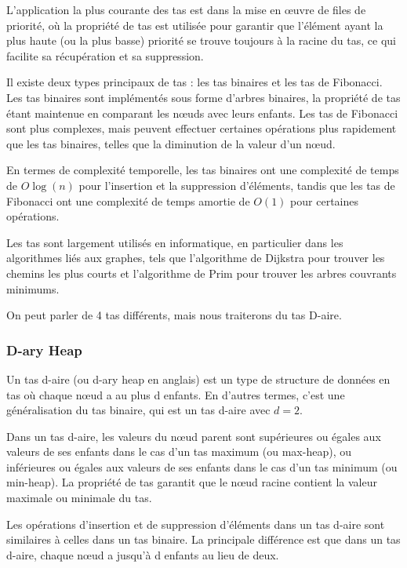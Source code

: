 \documentclass{article}
\begin{document}
            L'application la plus courante des tas est dans la mise en œuvre de files de priorité, où la propriété de tas est utilisée pour garantir que l'élément ayant la plus haute (ou la plus basse) priorité se trouve toujours à la racine du tas, ce qui facilite sa récupération et sa suppression.

            Il existe deux types principaux de tas : les tas binaires et les tas de Fibonacci. Les tas binaires sont implémentés sous forme d'arbres binaires, la propriété de tas étant maintenue en comparant les nœuds avec leurs enfants. Les tas de Fibonacci sont plus complexes, mais peuvent effectuer certaines opérations plus rapidement que les tas binaires, telles que la diminution de la valeur d'un nœud.

            En termes de complexité temporelle, les tas binaires ont une complexité de temps de $O\log(n)$ pour l'insertion et la suppression d'éléments, tandis que les tas de Fibonacci ont une complexité de temps amortie de $O(1)$  pour certaines opérations.

            Les tas sont largement utilisés en informatique, en particulier dans les algorithmes liés aux graphes, tels que l'algorithme de Dijkstra pour trouver les chemins les plus courts et l'algorithme de Prim pour trouver les arbres couvrants minimums.

            On peut parler de 4 tas différents, mais nous traiterons du tas D-aire.

            \subsubsection{D-ary Heap}
                Un tas d-aire (ou d-ary heap en anglais) est un type de structure de données en tas où chaque nœud a au plus d enfants. En d'autres termes, c'est une généralisation du tas binaire, qui est un tas d-aire avec $d=2$.

                Dans un tas d-aire, les valeurs du nœud parent sont supérieures ou égales aux valeurs de ses enfants dans le cas d'un tas maximum (ou max-heap), ou inférieures ou égales aux valeurs de ses enfants dans le cas d'un tas minimum (ou min-heap). La propriété de tas garantit que le nœud racine contient la valeur maximale ou minimale du tas.

                Les opérations d'insertion et de suppression d'éléments dans un tas d-aire sont similaires à celles dans un tas binaire. La principale différence est que dans un tas d-aire, chaque nœud a jusqu'à d enfants au lieu de deux.
\end{document}

